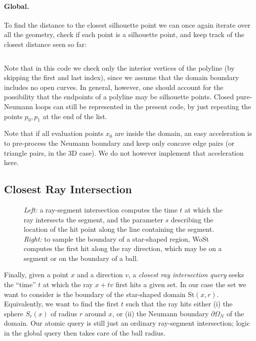 \documentclass{article}
\newcommand{\todo}[1]{\textbf{\hl{TODO: #1}}}
\newcommand{\St}{\text{St}}
\renewcommand{\vec}[1]{#1}
\begin{document}
\paragraph{Global.} To find the distance to the closest silhouette point we can once again iterate over all the geometry, check if each point is a silhouette point, and keep track of the closest distance seen so far:

\inputminted[fontsize=\small,linenos,firstline=77,lastline=88,bgcolor=bg]{cpp}{../code/WoStLaplace2D.cpp}
Note that in this code we check only the interior vertices of the polyline (by skipping the first and last index), since we assume that the domain boundary includes no open curves.  In general, however, one should account for the possibility that the endpoints of a polyline may be silhouette points.  Closed pure-Neumann loops can still be represented in the present code, by just repeating the points \(\vec{p}_0, \vec{p}_1\) at the end of the list.

Note that if all evaluation points \(x_0\) are inside the domain, an easy acceleration is to pre-process the Neumann boundary and keep only concave edge pairs (or triangle pairs, in the 3D case).  We do not however implement that acceleration here.

\subsection{Closest Ray Intersection}
\label{sec:ClosestRayIntersection}

\begin{figure}[h!]
   \centering
   
   
   \label{fig:RayIntersectionExample}
   \caption{\emph{Left:} a ray-segment intersection computes the time \(t\) at which the ray intersects the segment, and the parameter \(s\) describing the location of the hit point along the line containing the segment. \emph{Right:} to sample the boundary of a star-shaped region, WoSt computes the first hit along the ray direction, which may be on a segment or on the boundary of a ball.}
\end{figure}

Finally, given a point \(\vec{x}\) and a direction \(\vec{v}\), a \emph{closest ray intersection query} seeks the ``time'' \(t\) at which the ray \(\vec{x} + t\vec{v}\) first hits a given set.  In our case the set we want to consider is the boundary of the star-shaped domain \(\St(\vec{x},r)\).  Equivalently, we want to find the first \(t\) such that the ray hits either (i) the sphere \(S_r(\vec{x})\) of radius \(r\) around \(\vec{x}\), or (ii) the Neumann boundary \(\partial\Omega_N\) of the domain.  Our atomic query is still just an ordinary ray-segment intersection; logic in the global query then takes care of the ball radius.
\end{document}
